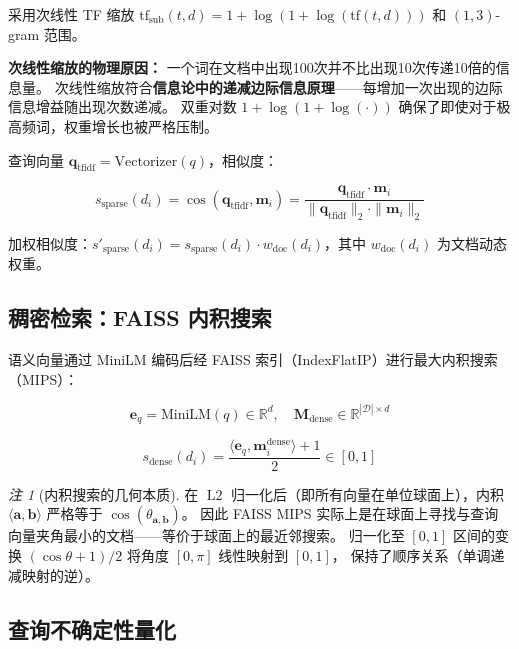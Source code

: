\documentclass[11pt,a4paper]{ctexart}
\theoremstyle{remark}
\newtheorem{remark}{注}[section]
\DeclareMathOperator{\Ltwo}{L2}
\begin{document}
采用次线性 TF 缩放 $\text{tf}_{\text{sub}}(t, d) = 1 + \log(1 + \log(\text{tf}(t, d)))$ 和 $(1,3)$-gram 范围。

\textbf{次线性缩放的物理原因：} 一个词在文档中出现100次并不比出现10次传递10倍的信息量。
次线性缩放符合\textbf{信息论中的递减边际信息原理}——每增加一次出现的边际信息增益随出现次数递减。
双重对数 $1 + \log(1 + \log(\cdot))$ 确保了即使对于极高频词，权重增长也被严格压制。

查询向量 $\mathbf{q}_{\text{tfidf}} = \text{Vectorizer}(q)$，相似度：

\begin{equation}
s_{\text{sparse}}(d_i) = \cos(\mathbf{q}_{\text{tfidf}}, \mathbf{m}_i) = \frac{\mathbf{q}_{\text{tfidf}} \cdot \mathbf{m}_i}{\|\mathbf{q}_{\text{tfidf}}\|_2 \cdot \|\mathbf{m}_i\|_2}
\end{equation}

加权相似度：$s'_{\text{sparse}}(d_i) = s_{\text{sparse}}(d_i) \cdot w_{\text{doc}}(d_i)$，其中 $w_{\text{doc}}(d_i)$ 为文档动态权重。

\subsection{稠密检索：FAISS 内积搜索}

语义向量通过 MiniLM 编码后经 FAISS 索引（IndexFlatIP）进行最大内积搜索（MIPS）：

\begin{equation}
\mathbf{e}_q = \text{MiniLM}(q) \in \mathbb{R}^{d}, \quad
\mathbf{M}_{\text{dense}} \in \mathbb{R}^{|\mathcal{D}| \times d}
\end{equation}

\begin{equation}
s_{\text{dense}}(d_i) = \frac{\langle \mathbf{e}_q, \mathbf{m}_i^{\text{dense}} \rangle + 1}{2} \in [0, 1]
\end{equation}

\begin{remark}[内积搜索的几何本质]
在 $\Ltwo$ 归一化后（即所有向量在单位球面上），内积 $\langle \mathbf{a}, \mathbf{b} \rangle$ 严格等于 $\cos(\theta_{\mathbf{a},\mathbf{b}})$。
因此 FAISS MIPS 实际上是在球面上寻找与查询向量夹角最小的文档——等价于球面上的最近邻搜索。
归一化至 $[0,1]$ 区间的变换 $(\cos\theta + 1)/2$ 将角度 $[0,\pi]$ 线性映射到 $[0,1]$，
保持了顺序关系（单调递减映射的逆）。
\end{remark}

\subsection{查询不确定性量化}
\end{document}
